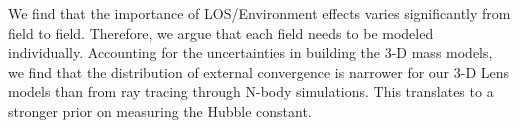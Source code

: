 We find that the importance of LOS/Environment effects varies significantly from field to field. Therefore, we argue that each field needs to be modeled individually. Accounting for the uncertainties in building the 3-D mass models, we find that the distribution of external convergence is narrower for our 3-D Lens models than from ray tracing through N-body simulations. This translates to a stronger prior on measuring the Hubble constant.
